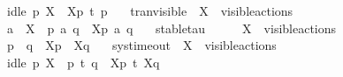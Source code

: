 \begin{isabellebody}
\ \ \ \ \ \ idle\ p\ X\ {\isasymLongrightarrow}\ {\isasymtheta}{\isacharbrackleft}{\kern0pt}X{\isacharbrackright}{\kern0pt}{\isacharparenleft}{\kern0pt}p{\isacharparenright}{\kern0pt}\ {\isasymlongmapsto}\isactrlsup {\isasymtheta}t{\isacharunderscore}{\kern0pt}{\isasymepsilon}\ {\isasymtheta}{\isacharparenleft}{\kern0pt}p{\isacharparenright}{\kern0pt}{\isacartoucheclose}\isanewline
\ \ {\isacharbar}{\kern0pt}\ tran{\isacharunderscore}{\kern0pt}visible{\isacharcolon}{\kern0pt}\ \ {\isacartoucheopen}X\ {\isasymsubseteq}\ visible{\isacharunderscore}{\kern0pt}actions\ {\isasymLongrightarrow}\ \isanewline
\ \ \ \ \ \ a\ {\isasymin}\ X\ {\isasymLongrightarrow}\ p\ {\isasymlongmapsto}a\ q\ {\isasymLongrightarrow}\ {\isasymtheta}{\isacharbrackleft}{\kern0pt}X{\isacharbrackright}{\kern0pt}{\isacharparenleft}{\kern0pt}p{\isacharparenright}{\kern0pt}\ {\isasymlongmapsto}\isactrlsup {\isasymtheta}a\ {\isasymtheta}{\isacharparenleft}{\kern0pt}q{\isacharparenright}{\kern0pt}{\isacartoucheclose}\isanewline
\ \ {\isacharbar}{\kern0pt}\ stable{\isacharunderscore}{\kern0pt}tau{\isacharcolon}{\kern0pt}\ \ \ \ \ \ {\isacartoucheopen}X\ {\isasymsubseteq}\ visible{\isacharunderscore}{\kern0pt}actions\ {\isasymLongrightarrow}\ \isanewline
\ \ \ \ \ \ p\ {\isasymlongmapsto}{\isasymtau}\ q\ {\isasymLongrightarrow}\ {\isasymtheta}{\isacharbrackleft}{\kern0pt}X{\isacharbrackright}{\kern0pt}{\isacharparenleft}{\kern0pt}p{\isacharparenright}{\kern0pt}\ {\isasymlongmapsto}\isactrlsup {\isasymtheta}{\isasymtau}\ {\isasymtheta}{\isacharbrackleft}{\kern0pt}X{\isacharbrackright}{\kern0pt}{\isacharparenleft}{\kern0pt}q{\isacharparenright}{\kern0pt}{\isacartoucheclose}\isanewline
\ \ {\isacharbar}{\kern0pt}\ sys{\isacharunderscore}{\kern0pt}timeout{\isacharcolon}{\kern0pt}\ \ {\isacartoucheopen}X\ {\isasymsubseteq}\ visible{\isacharunderscore}{\kern0pt}actions\ {\isasymLongrightarrow}\ \isanewline
\ \ \ \ \ \ idle\ p\ X\ {\isasymLongrightarrow}\ p\ {\isasymlongmapsto}t\ q\ {\isasymLongrightarrow}\ {\isasymtheta}{\isacharbrackleft}{\kern0pt}X{\isacharbrackright}{\kern0pt}{\isacharparenleft}{\kern0pt}p{\isacharparenright}{\kern0pt}\ {\isasymlongmapsto}\isactrlsup {\isasymtheta}t\ {\isasymtheta}{\isacharbrackleft}{\kern0pt}X{\isacharbrackright}{\kern0pt}{\isacharparenleft}{\kern0pt}q{\isacharparenright}{\kern0pt}{\isacartoucheclose}%
\isadelimdocument
%
\endisadelimdocument
%
\isatagdocument
%
\isamarkuptrue%
%
\endisatagdocument
{\isafolddocument}%
%
\isadelimdocument
%
\endisadelimdocument
%
\begin{isamarkuptext}%

\end{isamarkuptext}
\end{isabellebody}
